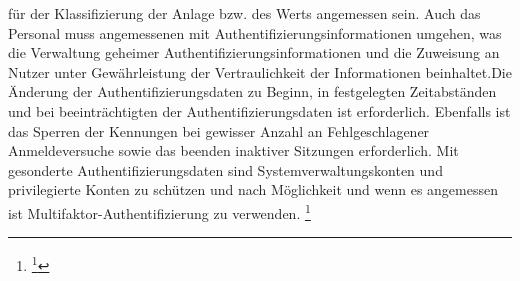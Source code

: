 \documentclass[11pt,a4paper,hidelinks]{article}   %
\begin{document}
für der Klassifizierung der Anlage bzw. des Werts angemessen sein. Auch das Personal muss angemessenen mit Authentifizierungsinformationen umgehen, was die Verwaltung geheimer Authentifizierungsinformationen und die Zuweisung an Nutzer unter Gewährleistung der Vertraulichkeit der Informationen beinhaltet.Die Änderung der Authentifizierungsdaten zu Beginn, in festgelegten Zeitabständen und bei beeinträchtigten der Authentifizierungsdaten ist erforderlich. Ebenfalls ist das Sperren der Kennungen bei gewisser Anzahl an Fehlgeschlagener Anmeldeversuche sowie das beenden inaktiver Sitzungen erforderlich. Mit gesonderte Authentifizierungsdaten sind Systemverwaltungskonten und privilegierte Konten zu schützen und nach Möglichkeit und wenn es angemessen ist Multifaktor-Authentifizierung zu verwenden. \footnote{
                    \footcite[Vgl. Anhang, Nummer 11][]{EU2024-2690}
                }\medbreak
\end{document}
